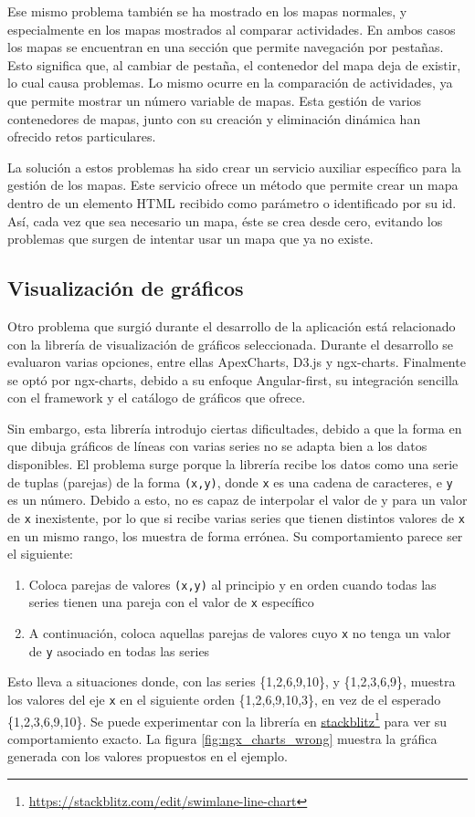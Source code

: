 Ese mismo problema también se ha mostrado en los mapas normales, y especialmente en los mapas mostrados al comparar actividades. En ambos casos los mapas se encuentran en una sección que permite navegación por pestañas. Esto significa que, al cambiar de pestaña, el contenedor del mapa deja de existir, lo cual causa problemas. Lo mismo ocurre en la comparación de actividades, ya que permite mostrar un número variable de mapas. Esta gestión de varios contenedores de mapas, junto con su creación y eliminación dinámica han ofrecido retos particulares.

La solución a estos problemas ha sido crear un servicio auxiliar específico para la gestión de los mapas. Este servicio ofrece un método que permite crear un mapa dentro de un elemento HTML recibido como parámetro o identificado por su id. Así, cada vez que sea necesario un mapa, éste se crea desde cero, evitando los problemas que surgen de intentar usar un mapa que ya no existe.

\subsection{Visualización de gráficos}

Otro problema que surgió durante el desarrollo de la aplicación está relacionado con la librería de visualización de gráficos seleccionada. Durante el desarrollo se evaluaron varias opciones, entre ellas ApexCharts, D3.js y ngx-charts. Finalmente se optó por ngx-charts, debido a su enfoque Angular-first, su integración sencilla con el framework y el catálogo de gráficos que ofrece.

Sin embargo, esta librería introdujo ciertas dificultades, debido a que la forma en que dibuja gráficos de líneas con varias series no se adapta bien a los datos disponibles. El problema surge porque la librería recibe los datos como una serie de tuplas (parejas) de la forma \texttt{(x,y)}, donde \texttt{x} es una cadena de caracteres, e \texttt{y} es un número. Debido a esto, no es capaz de interpolar el valor de y para un valor de \texttt{x} inexistente, por lo que si recibe varias series que tienen distintos valores de \texttt{x} en un mismo rango, los muestra de forma errónea. Su comportamiento parece ser el siguiente:
\begin{enumerate}
    \item Coloca parejas de valores \texttt{(x,y)} al principio y en orden cuando todas las series tienen una pareja con el valor de \texttt{x} específico
    \item A continuación, coloca aquellas parejas de valores cuyo \texttt{x} no tenga un valor de \texttt{y} asociado en todas las series
\end{enumerate}
Esto lleva a situaciones donde, con las series \{1,2,6,9,10\}, y \{1,2,3,6,9\}, muestra los valores del eje \texttt{x} en el siguiente orden \{1,2,6,9,10,3\}, en vez de el esperado \{1,2,3,6,9,10\}. Se puede experimentar con la librería  en \href{https://stackblitz.com/edit/swimlane-line-chart}{\uline{stackblitz}}\footnote{\url{https://stackblitz.com/edit/swimlane-line-chart}} para ver su comportamiento exacto. La figura \ref{fig:ngx_charts_wrong} muestra la gráfica generada con los valores propuestos en el ejemplo.

